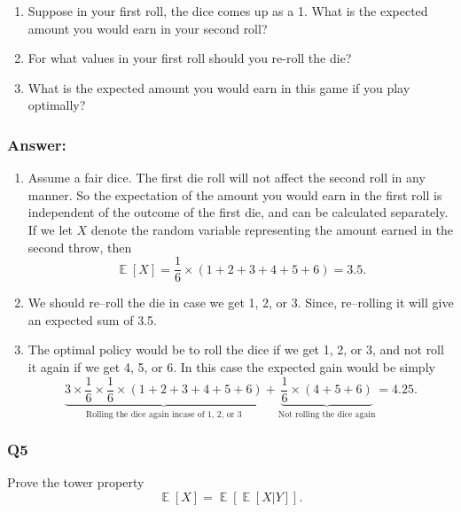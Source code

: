 \documentclass[a4paper, 10pt]{article}
\DeclareMathOperator{\E}{\mathbb{E}}
\begin{document}
\begin{enumerate}
\item Suppose in your first roll, the dice comes up as a 1.  What is the expected amount you would earn in your second roll?
\item For what values in your first roll should you re-roll the die?
\item What is the expected amount you would earn in this game if you play optimally?
\end{enumerate}

\subsubsection*{Answer:}
\begin{enumerate}
\item Assume a fair dice. The first die roll will not affect the second roll in any manner. So the expectation of the amount you would earn in the first roll is independent of the outcome of the first die, and can be calculated separately. If we let $X$ denote the random variable representing the amount earned in the second throw, then
\begin{equation*}
  \E[X] = \frac{1}{6} \times (1+2+3+4+5+6) = 3.5.
\end{equation*}

\item We should re--roll the die in case we get 1, 2, or 3. Since, re--rolling it will give an expected sum of 3.5.

\item The optimal policy would be to roll the dice if we get 1, 2, or 3, and not roll it again if we get 4, 5, or 6. In this case the expected gain would be simply
  \begin{equation*}
    \underbrace{3 \times \frac{1}{6} \times \frac{1}{6} \times (1 + 2 + 3 + 4 + 5 + 6)}_{\text{Rolling the dice again incase of 1, 2, or 3}}  + \underbrace{\frac{1}{6} \times (4 + 5 + 6) }_{\text{Not rolling the dice again}} = 4.25.
  \end{equation*}
\end{enumerate}
  
\subsubsection*{Q5}
Prove the tower property
\[
    \E[X] = \E\left[\E[X|Y]\right].
\]

\end{document}
